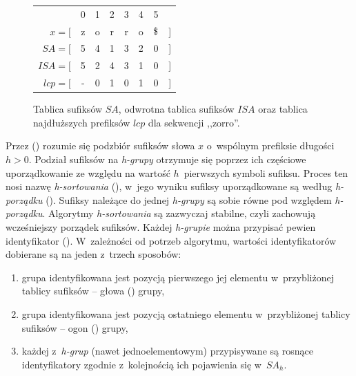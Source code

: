 \begin{figure}[t]
    \begin{center}
        \begin{tabular}{ r c c c c c c l}
                           & 0 & 1 & 2 & 3 & 4 &  5   &   \\ \cmidrule{2-7}
                   $x = [$ & z & o & r & r & o & $\dollar$ & ] \\
         $\mathit{SA} = [$ & 5 & 4 & 1 & 3 & 2 &  0   & ] \\
        $\mathit{ISA} = [$ & 5 & 2 & 4 & 3 & 1 &  0   & ] \\
        $\mathit{lcp} = [$ & - & 0 & 1 & 0 & 1 &  0   & ] \\
        \end{tabular}
    \end{center}
\caption{Tablica sufiksów $\mathit{SA}$, odwrotna tablica sufiksów $\mathit{ISA}$
oraz tablica najdłuższych prefiksów $\mathit{lcp}$ dla sekwencji
,,zorro\dollar''.}%
\label{rys:suffix-array}
\end{figure}

Przez  () \cite{taxonomy} rozumie się podzbiór
sufiksów słowa $x$ o~wspólnym prefiksie długości $h>0$.
Podział sufiksów na \emph{h-grupy} otrzymuje się poprzez ich częściowe
uporządkowanie ze względu na wartość $h$~pierwszych symboli sufiksu.
Proces ten nosi nazwę \emph{h-sortowania} (), w~jego
wyniku sufiksy uporządkowane są według \emph{h-porządku}
(). Sufiksy należące do jednej \emph{h-grupy} są sobie
równe pod względem \emph{h-porządku}. Algorytmy \emph{h-sortowania}
są zazwyczaj stabilne, czyli zachowują wcześniejszy porządek sufiksów.
Każdej \emph{h-grupie} można przypisać pewien identyfikator
(). W~zależności od potrzeb algorytmu, wartości
identyfikatorów dobierane są na jeden z~trzech sposobów:
\begin{enumerate}
  \item grupa identyfikowana jest pozycją pierwszego jej elementu w~przybliżonej tablicy sufiksów -- głowa () grupy,
  \item grupa identyfikowana jest pozycją ostatniego elementu w~przybliżonej
   tablicy sufiksów -- ogon () grupy,
  \item  każdej z~\emph{h-grup} (nawet jednoelementowym) przypisywane są
  rosnące identyfikatory zgodnie z~kolejnością ich pojawienia się w~$\textit{SA}_h$.
\end{enumerate}

